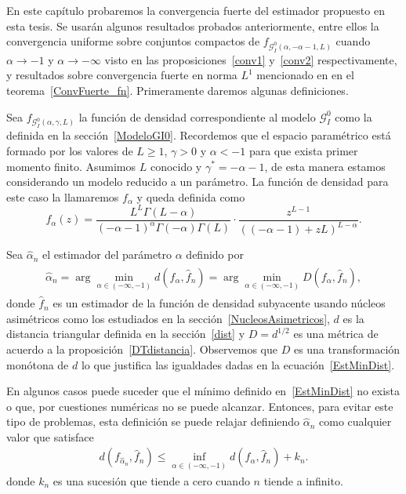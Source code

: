 En este capítulo probaremos la convergencia fuerte del estimador propuesto en esta tesis. Se usarán algunos resultados probados anteriormente, entre ellos la convergencia uniforme sobre conjuntos compactos de $f_{\mathcal{G}_I^0(\alpha,-\alpha-1,L)}$ cuando $\alpha \to -1$ y $\alpha \to -\infty$ visto en las proposiciones~\ref{conv1} y~\ref{conv2} respectivamente, y resultados sobre convergencia fuerte en norma $L^1$ mencionado en en el teorema~\ref{ConvFuerte_fn}. Primeramente daremos algunas definiciones.

Sea $f_{\mathcal{G}_I^0(\alpha,\gamma,L)}$ la función de densidad correspondiente al modelo $\mathcal{G}_I^0$ como la definida en la sección~\ref{ModeloGI0}. Recordemos que el espacio paramétrico está formado por los valores de $L\geq 1$, $\gamma>0$ y $\alpha<-1$ para que exista primer momento finito. 
Asumimos $L$ conocido y $\gamma^* = -\alpha-1$, de esta manera estamos considerando un modelo reducido a un parámetro. La función de densidad para este caso la llamaremos $f_{\alpha}$ y queda definida como
\begin{equation}
f_{\alpha}( z) =\frac{L^{L}\Gamma ( L-\alpha
	) }{(-\alpha-1) ^{\alpha }\Gamma ( -\alpha ) \Gamma (
	L) }\cdot  
\frac{z^{L-1}}{((-\alpha-1) +zL) ^{L-\alpha }}.
\label{modeloreducido}
\end{equation}

Sea $\widehat{\alpha}_n$ el estimador del parámetro $\alpha$ definido por
\begin{align}
\label{EstMinDist}
\begin{split}
\widehat{\alpha}_{n}=\arg\min\limits_{\alpha \in (-\infty,-1)}d(f_{\alpha},\widehat{f}_n)=\arg\min\limits_{\alpha \in (-\infty,-1)}D(f_{\alpha},\widehat{f}_n),
\end{split}
\end{align}
donde $\widehat{f}_n$ es un estimador de la función de densidad subyacente usando núcleos asimétricos como los estudiados en la sección~\ref{NucleosAsimetricos}, $d$ es la distancia triangular definida en la sección~\ref{dist} y $D=d^{1/2}$ es una métrica de acuerdo a la proposición~\ref{DTdistancia}. Observemos que $D$ es una transformación monótona de $d$ lo que justifica las igualdades dadas en la ecuación~\eqref{EstMinDist}.

En algunos casos puede suceder que el mínimo definido en~\eqref{EstMinDist} no exista o que, por cuestiones numéricas no se puede alcanzar. Entonces, para evitar este tipo de problemas, esta definición se puede relajar definiendo $\widehat{\alpha}_n$ como cualquier valor que satisface
\begin{align}
\label{EstMinDistRelajado}
d(f_{\widehat{\alpha}_{n}},\widehat{f}_n) \leq \inf\limits_{\alpha \in (-\infty,-1)}d(f_{{\alpha}},\widehat{f}_n) + k_n.
\end{align}
donde $k_n$ es una sucesión que tiende a cero cuando $n$ tiende a infinito. 


